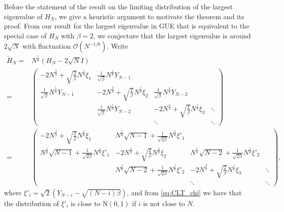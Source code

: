 \documentclass[11pt, a4paper]{article}
\numberwithin{equation}{section}
\newcommand{\bigO}{\mathcal{O}}
\newcommand{\Normal}{\mathrm{N}}
\theoremstyle{definition}
\theoremstyle{remark}
\begin{document}
Before the statement of the result on the limiting distribution of the largest eigenvalue of $H_N$, we give a heuristic argument to motivate the theorem and its proof. From our result for the largest eigenvalue in GUE that is equivalent to the special case of $H_N$ with $\beta = 2$, we conjecture that the largest eigenvalue is around $2\sqrt{N}$ with fluctuation $\bigO(N^{-1/6})$. Write
\begin{equation}
  \begin{split}
    \tilde{H}_N = {}& N^{\frac{1}{6}} (H_N - 2\sqrt{N}I) \\
    = {}&
    \begin{pmatrix}
      -2N^{\frac{2}{3}} + \sqrt{\frac{2}{\beta}} N^{\frac{1}{6}} \xi_1 & \frac{1}{\sqrt{\beta}} N^{\frac{1}{6}} Y_{N - 1} & & \\
      \frac{1}{\sqrt{\beta}} N^{\frac{1}{6}} Y_{N - 1} & -2N^{\frac{2}{3}} + \sqrt{\frac{2}{\beta}} N^{\frac{1}{6}} \xi_2 & \frac{1}{\sqrt{\beta}} N^{\frac{1}{6}} Y_{N - 2} & \\
      & \frac{1}{\sqrt{\beta}} N^{\frac{1}{6}} Y_{N - 2} & -2N^{\frac{2}{3}} + \sqrt{\frac{2}{\beta}} N^{\frac{1}{6}} \xi_3 & \ddots \\
      & & \ddots & \ddots 
    \end{pmatrix} \\
    = {}&
    \begin{pmatrix}
      -2N^{\frac{2}{3}} + \sqrt{\frac{2}{\beta}} N^{\frac{1}{6}} \xi_1 & N^{\frac{1}{6}} \sqrt{N - 1} + \frac{1}{\sqrt{2\beta}} N^{\frac{1}{6}} \xi'_1 & & \\
      N^{\frac{1}{6}} \sqrt{N - 1} + \frac{1}{\sqrt{2\beta}} N^{\frac{1}{6}} \xi'_1 & -2N^{\frac{2}{3}} + \sqrt{\frac{2}{\beta}} N^{\frac{1}{6}} \xi_2 & N^{\frac{1}{6}} \sqrt{N - 2} + \frac{1}{\sqrt{2\beta}} N^{\frac{1}{6}} \xi'_2 & \\
       & N^{\frac{1}{6}} \sqrt{N - 2} + \frac{1}{\sqrt{2\beta}} N^{\frac{1}{6}} \xi'_2 & -2N^{\frac{2}{3}} + \sqrt{\frac{2}{\beta}} N^{\frac{1}{6}} \xi_3 & \ddots \\
       & & \ddots & \ddots
    \end{pmatrix},
  \end{split}
\end{equation}
where $\xi'_i = \sqrt{2}(Y_{N - i} - \sqrt{(N - i)\beta})$, and from \eqref{eq:CLT_chi} we have that the distribution of $\xi'_i$ is close to $\Normal(0, 1)$ if $i$ is not close to $N$.
\end{document}
